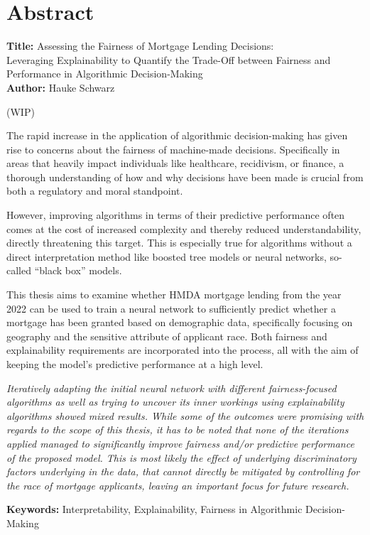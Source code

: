 \chapter*{Abstract}\label{abstract}

\noindent
\textbf{Title:} Assessing the Fairness of Mortgage Lending Decisions: \\
Leveraging Explainability to Quantify the Trade-Off between Fairness and Performance in Algorithmic Decision-Making \\ 
\textbf{Author:} Hauke Schwarz
\vspace{1em}

(WIP)

The rapid increase in the application of algorithmic decision-making has given rise to concerns about the fairness of machine-made decisions. Specifically in areas that heavily impact individuals like healthcare, recidivism, or finance, a thorough understanding of how and why decisions have been made is crucial from both a regulatory and moral standpoint.

However, improving algorithms in terms of their predictive performance often comes at the cost of increased complexity and thereby reduced understandability, directly threatening this target. This is especially true for algorithms without a direct interpretation method like boosted tree models or neural networks, so-called “black box” models.

This thesis aims to examine whether HMDA mortgage lending from the year 2022 can be used to train a neural network to sufficiently predict whether a mortgage has been granted based on demographic data, specifically focusing on geography and the sensitive attribute of applicant race. Both fairness and explainability requirements are incorporated into the process, all with the aim of keeping the model’s predictive performance at a high level.

\textit{
Iteratively adapting the initial neural network with different fairness-focused algorithms as well as trying to uncover its inner workings using explainability algorithms showed mixed results. While some of the outcomes were promising with regards to the scope of this thesis, it has to be noted that none of the iterations applied managed to significantly improve fairness and/or predictive performance of the proposed model. This is most likely the effect of underlying discriminatory factors underlying in the data, that cannot directly be mitigated by controlling for the race of mortgage applicants, leaving an important focus for future research.
}

\vspace{3em}

\textbf{Keywords:} Interpretability, Explainability, Fairness in Algorithmic Decision-Making \\